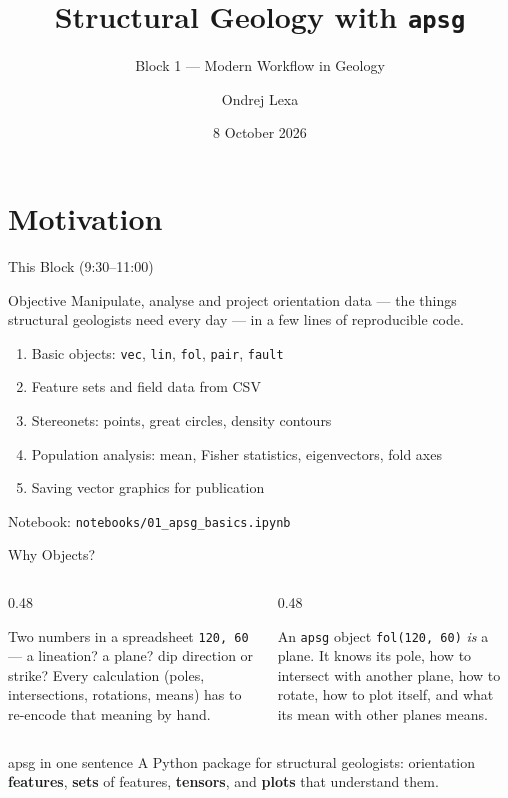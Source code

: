 \documentclass[aspectratio=169,11pt]{beamer}
\title[apsg basics]{Structural Geology with \texttt{apsg}}
\subtitle{Block 1 --- Modern Workflow in Geology}
\author[O.\ Lexa]{Ondrej Lexa}
\institute[Charles University]{
  Institute of Petrology and Structural Geology (IPSG)\\
  Charles University, Prague, Czechia
}
\date{8 October 2026}
\begin{document}
\begin{frame}[plain]
  \titlepage
\end{frame}

\section{Motivation}

\begin{frame}{This Block (9:30--11:00)}
  \begin{block}{Objective}
    Manipulate, analyse and project orientation data --- the things structural
    geologists need every day --- in a few lines of reproducible code.
  \end{block}
  \vspace{0.3cm}
  \begin{enumerate}
    \item Basic objects: \texttt{vec}, \texttt{lin}, \texttt{fol}, \texttt{pair}, \texttt{fault}
    \item Feature sets and field data from CSV
    \item Stereonets: points, great circles, density contours
    \item Population analysis: mean, Fisher statistics, eigenvectors, fold axes
    \item Saving vector graphics for publication
  \end{enumerate}
  \vspace{0.2cm}
  \small Notebook: \texttt{notebooks/01\_apsg\_basics.ipynb}
\end{frame}

\begin{frame}{Why Objects?}
  \begin{columns}[T]
    \begin{column}{0.48\textwidth}
      \begin{alertblock}{Two numbers in a spreadsheet}
        \small
        \texttt{120, 60} --- a lineation? a plane? dip direction or strike?
        Every calculation (poles, intersections, rotations, means) has to
        re-encode that meaning by hand.
      \end{alertblock}
    \end{column}
    \begin{column}{0.48\textwidth}
      \begin{exampleblock}{An \texttt{apsg} object}
        \small
        \texttt{fol(120, 60)} \emph{is} a plane. It knows its pole, how to
        intersect with another plane, how to rotate, how to plot itself, and
        what its mean with other planes means.
      \end{exampleblock}
    \end{column}
  \end{columns}
  \vspace{0.4cm}
  \begin{block}{apsg in one sentence}
    A Python package for structural geologists: orientation \textbf{features},
    \textbf{sets} of features, \textbf{tensors}, and \textbf{plots} that
    understand them.
  \end{block}
\end{frame}
\end{document}
